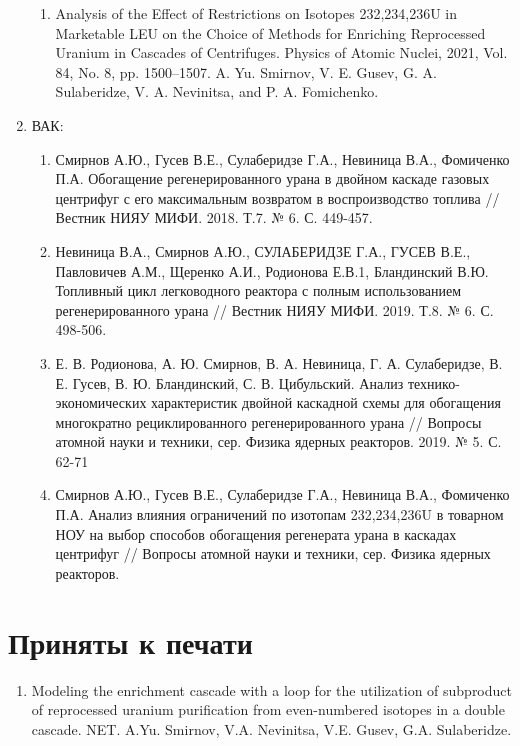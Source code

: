 \begin{enumerate}
\begin{enumerate}
        \item Analysis of the Effect of Restrictions on Isotopes 232,234,236U in Marketable LEU on the Choice of Methods for Enriching Reprocessed Uranium in Cascades of Centrifuges. Physics of Atomic Nuclei, 2021, Vol. 84, No. 8, pp. 1500–1507. A. Yu. Smirnov, V. E. Gusev, G. A. Sulaberidze, V. A. Nevinitsa, and P. A. Fomichenko.
    \end{enumerate}
    \item ВАК:
    \begin{enumerate}
        \item Смирнов А.Ю., Гусев В.Е., Сулаберидзе Г.А., Невиница В.А., Фомиченко П.А. Обогащение регенерированного урана в двойном каскаде газовых центрифуг с его максимальным возвратом в воспроизводство топлива // Вестник НИЯУ МИФИ. 2018. Т.7. № 6. С. 449-457.
        \item 	Невиница В.А., Смирнов А.Ю., СУЛАБЕРИДЗЕ Г.А., ГУСЕВ В.Е., Павловичев А.М., Щеренко А.И., Родионова Е.В.1, Бландинский В.Ю. Топливный цикл легководного реактора с полным использованием регенерированного урана // Вестник НИЯУ МИФИ. 2019. Т.8. № 6. С. 498-506.
        \item Е. В. Родионова, А. Ю. Смирнов, В. А. Невиница, Г. А. Сулаберидзе, В. Е. Гусев, В. Ю. Бландинский, С. В. Цибульский. Анализ технико-экономических характеристик двойной каскадной схемы для обогащения многократно рециклированного регенерированного урана // Вопросы атомной науки и техники, сер. Физика ядерных реакторов. 2019. № 5. С. 62-71
        \item Смирнов А.Ю., Гусев В.Е., Сулаберидзе Г.А., Невиница В.А., Фомиченко П.А. Анализ влияния ограничений по изотопам 232,234,236U в товарном НОУ на выбор способов обогащения регенерата урана в каскадах центрифуг //  Вопросы атомной науки и техники, сер. Физика ядерных реакторов.
        \end{enumerate}
\end{enumerate}

\section{Приняты к печати}
\begin{enumerate}
    \item Modeling the enrichment cascade with a loop for the utilization of subproduct of reprocessed uranium purification from even-numbered isotopes in a double cascade. NET. A.Yu. Smirnov, V.A. Nevinitsa, V.E. Gusev, G.A. Sulaberidze.
\end{enumerate}

